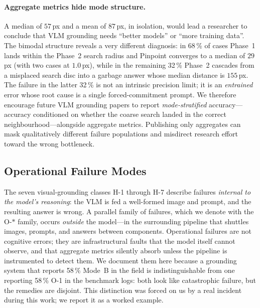 \paragraph{Aggregate metrics hide mode structure.}
A median of $57$\,px and a mean of $87$\,px, in isolation, would lead
a researcher to conclude that VLM grounding needs ``better models''
or ``more training data''.  The bimodal structure reveals a very
different diagnosis: in 68\,\% of cases Phase~1 lands within the
Phase~2 search radius and Pinpoint converges to a median of $29$\,px
(with two cases at $1.0$\,px), while in the remaining 32\,\% Phase~2
cascades from a misplaced search disc into a garbage answer whose
median distance is $155$\,px.  The failure in the latter 32\,\% is
not an intrinsic precision limit; it is an \emph{entrained} error
whose root cause is a single forced-commitment prompt.  We therefore
encourage future VLM grounding papers to report
\emph{mode-stratified} accuracy---accuracy conditioned on whether the
coarse search landed in the correct neighbourhood---alongside
aggregate metrics.  Publishing only aggregates can mask
qualitatively different failure populations and misdirect research
effort toward the wrong bottleneck.

\subsection{Operational Failure Modes}
\label{sec:operational-failures}

The seven visual-grounding classes H-1 through H-7 describe failures
\emph{internal to the model's reasoning}: the VLM is fed a well-formed
image and prompt, and the resulting answer is wrong.  A parallel
family of failures, which we denote with the O-$\ast$ family,
occurs \emph{outside} the model---in the surrounding pipeline that
shuttles images, prompts, and answers between components.  Operational
failures are not cognitive errors; they are infrastructural faults
that the model itself cannot observe, and that aggregate metrics
silently absorb unless the pipeline is instrumented to detect them.
We document them here because a grounding system that reports 58\,\%
Mode~B in the field is indistinguishable from one reporting 58\,\%
O-1 in the benchmark logs: both look like catastrophic failure, but
the remedies are disjoint.  This distinction was forced on us by a
real incident during this work; we report it as a worked example.

